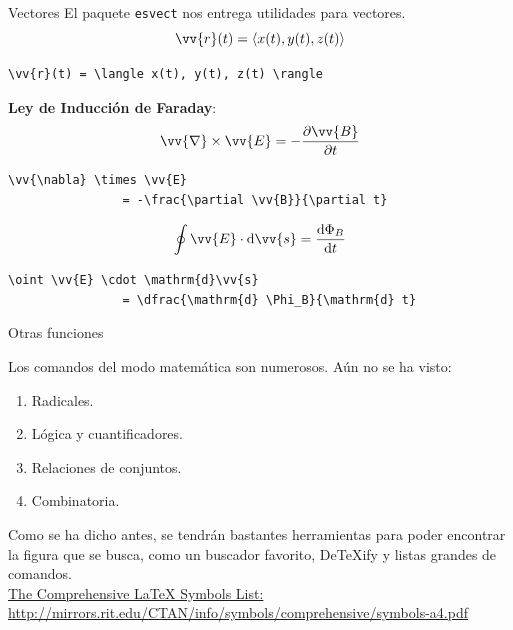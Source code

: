 \documentclass[../slides.tex]{subfiles}
\begin{document}
    \begin{frame}[fragile]{Vectores}
        El paquete \texttt{esvect} nos entrega utilidades para vectores.
        \[ \vv{r}(t) = \langle x(t), y(t), z(t) \rangle \]
        \begin{verbatim}
\vv{r}(t) = \langle x(t), y(t), z(t) \rangle
        \end{verbatim}
            
        \textbf{Ley de Inducción de Faraday}:
        \[ \vv{\nabla} \times \vv{E} = - \frac{\partial \vv{B}}{\partial t} \]
        \begin{verbatim}
\vv{\nabla} \times \vv{E} 
                = -\frac{\partial \vv{B}}{\partial t}
        \end{verbatim}
        \[ \oint \vv{E} \cdot \text{d}\vv{s} = \dfrac{\text{d} \Phi_B}{\text{d} t} \]
        \begin{verbatim}
\oint \vv{E} \cdot \mathrm{d}\vv{s} 
                = \dfrac{\mathrm{d} \Phi_B}{\mathrm{d} t} 
        \end{verbatim}            
    \end{frame}
    
    \begin{frame}{Otras funciones}
    	\begin{block}{}   
    		Los comandos del modo matemática son numerosos. Aún no se ha visto:
                \begin{enumerate}
                	\item Radicales.
                	\item Lógica y cuantificadores.
                	\item Relaciones de conjuntos.
                	\item Combinatoria.
                \end{enumerate}
            Como se ha dicho antes, se tendrán bastantes herramientas para poder encontrar la figura que se busca, como un buscador favorito, DeTeXify y listas grandes de comandos.\\[\baselineskip]
            
            \href{http://mirrors.rit.edu/CTAN/info/symbols/comprehensive/symbols-a4.pdf}{The Comprehensive \LaTeX{} Symbols List: http://mirrors.rit.edu/CTAN/info/symbols/comprehensive/symbols-a4.pdf}
    	\end{block}

    \end{frame}
\end{document}
